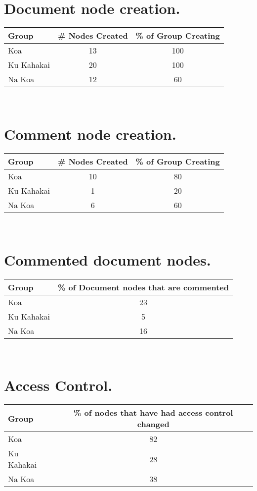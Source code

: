 \section{Document node creation.}
\begin{tabular}{|l|c|c|}
\hline
Group&\# Nodes Created&\% of Group Creating\\
\hline
Koa&13&100\\
\hline
Ku Kahakai&20&100\\
\hline
Na Koa&12&60\\
\hline
\end{tabular} \\

\section{Comment node creation.}
\begin{tabular}{|l|c|c|}
\hline
Group&\# Nodes Created&\% of Group Creating\\
\hline
Koa&10&80\\
\hline
Ku Kahakai&1&20\\
\hline
Na Koa&6&60\\
\hline
\end{tabular} \\

\section{Commented document nodes.}
\begin{tabular}{|l|c|}
\hline
Group&\% of Document nodes that are commented\\
\hline
Koa&23\\
\hline
Ku Kahakai&5\\
\hline
Na Koa&16\\
\hline
\end{tabular} \\


\section{Access Control.}
\begin{tabular}{|l|c|}
\hline
Group&\% of nodes that have had access control changed\\
\hline
Koa&82\\
\hline
Ku Kahakai&28\\
\hline
Na Koa&38\\
\hline
\end{tabular} \\


